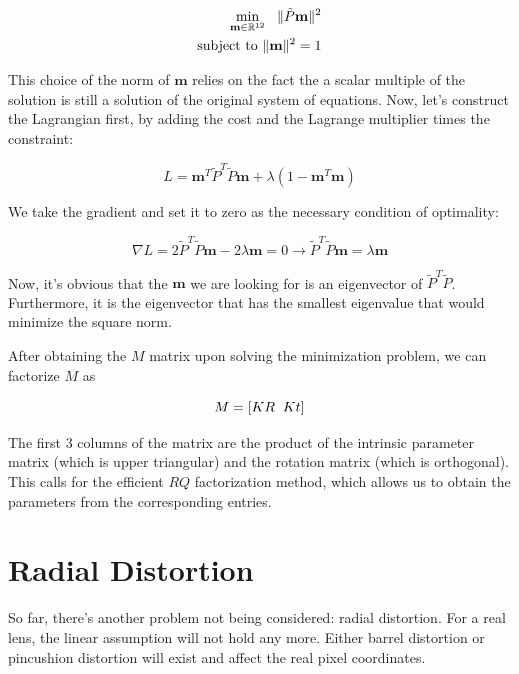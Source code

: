 \documentclass[]{article}
\begin{document}
\begin{align}
    \underset{\mathbf{m} \in \mathbb{R}^{12}}{\text{min}} \hspace{3mm} \| \tilde{P} \mathbf{m} \|^2 \\
    \text{subject to } \| \mathbf{m} \|^2 = 1
\end{align}

This choice of the norm of $\mathbf{m}$ relies on the fact the a scalar multiple of the solution is still a solution of the original system of equations. Now, let's construct the Lagrangian first, by adding the cost and the Lagrange multiplier times the constraint:

\begin{equation}
    L = \mathbf{m}^T\tilde{P}^T\tilde{P}\mathbf{m} + \lambda(1 - \mathbf{m}^T \mathbf{m})
\end{equation}

We take the gradient and set it to zero as the necessary condition of optimality:

\begin{equation}
    \nabla L = 2\tilde{P}^T \tilde{P} \mathbf{m} - 2\lambda \mathbf{m} = 0  \xrightarrow{} \tilde{P}^T \tilde{P} \mathbf{m} = \lambda \mathbf{m}
\end{equation}

Now, it's obvious that the $\mathbf{m}$ we are looking for is an eigenvector of $\tilde{P}^T \tilde{P}$. Furthermore, it is the eigenvector that has the smallest eigenvalue that would minimize the square norm.

After obtaining the $M$ matrix upon solving the minimization problem, we can factorize $M$ as

\begin{equation}
    M = [KR \hspace{2mm} Kt]
\end{equation}

The first 3 columns of the matrix are the product of the intrinsic parameter matrix (which is upper triangular) and the rotation matrix (which is orthogonal). This calls for the efficient $RQ$ factorization method, which allows us to obtain the parameters from the corresponding entries.



\section{Radial Distortion}
So far, there's another problem not being considered: radial distortion. For a real lens, the linear assumption will not hold any more. Either barrel distortion or pincushion distortion will exist and affect the real pixel coordinates.
\end{document}
